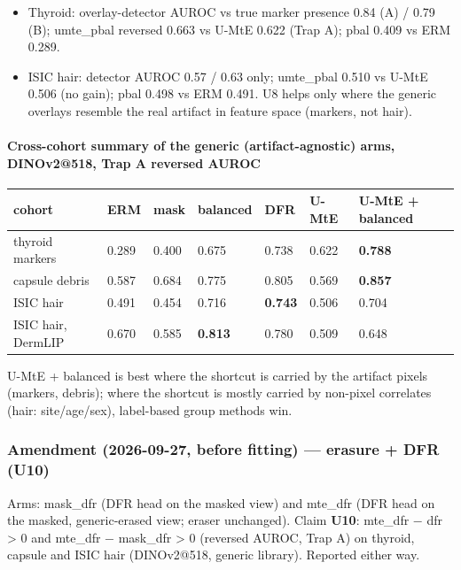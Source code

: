 {\begin{itemize}

\item
  Thyroid: overlay-detector AUROC vs true marker presence 0.84 (A) / 0.79 (B); umte\_pbal reversed 0.663 vs U-MtE
  0.622 (Trap A); pbal 0.409 vs ERM 0.289.
\item
  ISIC hair: detector AUROC 0.57 / 0.63 only; umte\_pbal 0.510 vs U-MtE 0.506 (no gain); pbal 0.498 vs ERM 0.491.
  U8 helps only where the generic overlays resemble the real artifact in feature space (markers, not hair).
\end{itemize}

\paragraph{Cross-cohort summary of the generic (artifact-agnostic) arms, DINOv2@518, Trap A reversed AUROC}\label{cross-cohort-summary-of-the-generic-artifact-agnostic-arms-dinov2518-trap-a-reversed-auroc}

{ %
\begin{longtable}[]{@{}lllllll@{}}
\toprule\noalign{}
cohort & ERM & mask & balanced & DFR & U-MtE & U-MtE + balanced \\
\midrule\noalign{}
\endhead
\bottomrule\noalign{}
\endlastfoot
thyroid markers & 0.289 & 0.400 & 0.675 & 0.738 & 0.622 & \textbf{0.788} \\
capsule debris & 0.587 & 0.684 & 0.775 & 0.805 & 0.569 & \textbf{0.857} \\
ISIC hair & 0.491 & 0.454 & 0.716 & \textbf{0.743} & 0.506 & 0.704 \\
ISIC hair, DermLIP & 0.670 & 0.585 & \textbf{0.813} & 0.780 & 0.509 & 0.648 \\
\end{longtable}
}

U-MtE + balanced is best where the shortcut is carried by the artifact pixels (markers, debris); where the
shortcut is mostly carried by non-pixel correlates (hair: site/age/sex), label-based group methods win.

\subsubsection{Amendment (2026-09-27, before fitting) --- erasure + DFR (U10)}\label{amendment-2026-09-27-before-fitting--erasure--dfr-u10}

Arms: mask\_dfr (DFR head on the masked view) and mte\_dfr (DFR head on the masked, generic-erased view; eraser
unchanged). Claim \textbf{U10}: mte\_dfr − dfr \textgreater{} 0 and mte\_dfr − mask\_dfr \textgreater{} 0 (reversed AUROC, Trap A) on thyroid,
capsule and ISIC hair (DINOv2@518, generic library). Reported either way.

}
